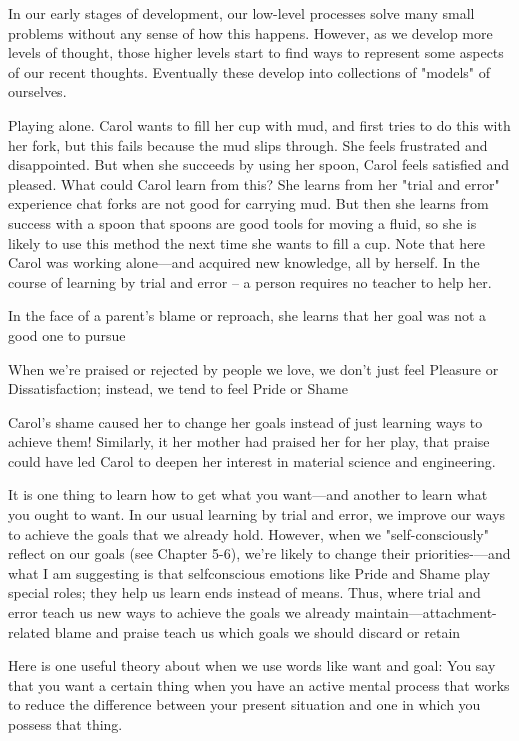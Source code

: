 \documentclass[10pt,a4paper]{article}
\begin{document}
In our early stages of development, our low-level processes solve many small problems without any sense of how this happens. However, as we develop more levels of thought, those higher levels start to find ways to represent some aspects of our recent thoughts. Eventually these develop into collections of "models" of ourselves. \cite[p.~34-35]{minsky}

Playing alone. Carol wants to fill her cup with mud, and first tries to do this with her fork, but this fails because the mud slips through. She feels frustrated and disappointed. But when she succeeds by using her spoon, Carol feels satisfied and pleased. What could Carol learn from this? She learns from her "trial and error" experience chat forks are not good for carrying mud. But then she learns from success with a spoon that spoons are good tools for moving a fluid, so she is likely to use this method the next time she wants to fill a cup. Note that here Carol was working alone—and acquired new knowledge, all by herself. In the course of learning by trial and error -- a person requires no teacher to help her. \cite[p.~36-37]{minsky}

In the face of a parent's blame or reproach, she learns that her goal was not a good one to pursue \cite[p.~37]{minsky}

When we're praised or rejected by people we love, we don't just feel Pleasure or Dissatisfaction; instead, we tend to feel Pride or Shame \cite[p.~38]{minsky}

Carol's shame caused her to change her goals instead of just learning ways to achieve them! Similarly, it her mother had praised her for her play, that praise could have led Carol to deepen her interest in material science and engineering. \cite[p.~39]{minsky}

It is one thing to learn how to get what you want—and another to learn what you ought to want. In our usual learning by trial and error, we improve our ways to achieve the goals that we already hold. However, when we "self-consciously" reflect on our goals (see Chapter 5-6), we're likely to change their priorities-—and what I am suggesting is that selfconscious emotions like Pride and Shame play special roles; they help us learn ends instead of means. Thus, where trial and error teach us new ways to achieve the goals we already maintain—attachment-related blame and praise teach us which goals we should discard or retain \cite[p.~39]{minsky}

Here is one useful theory about when we use words like want and goal: You say that you want a certain thing when you have an active mental process that works to reduce the difference between your present situation and one in which you possess that thing. \cite[p.~40]{minsky}
\end{document}
